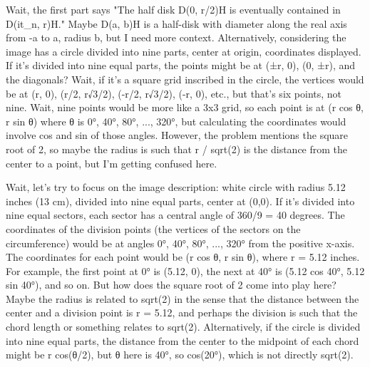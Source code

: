 Wait, the first part says "The half disk D(0, r/2)H is eventually contained in D(it_n, r)H." Maybe D(a, b)H is a half-disk with diameter along the real axis from -a to a, radius b, but I need more context. Alternatively, considering the image has a circle divided into nine parts, center at origin, coordinates displayed. If it's divided into nine equal parts, the points might be at (±r, 0), (0, ±r), and the diagonals? Wait, if it's a square grid inscribed in the circle, the vertices would be at (r, 0), (r/2, r√3/2), (-r/2, r√3/2), (-r, 0), etc., but that's six points, not nine. Wait, nine points would be more like a 3x3 grid, so each point is at (r cos θ, r sin θ) where θ is 0°, 40°, 80°, ..., 320°, but calculating the coordinates would involve cos and sin of those angles. However, the problem mentions the square root of 2, so maybe the radius is such that r / sqrt(2) is the distance from the center to a point, but I'm getting confused here. 

Wait, let's try to focus on the image description: white circle with radius 5.12 inches (13 cm), divided into nine equal parts, center at (0,0). If it's divided into nine equal sectors, each sector has a central angle of 360/9 = 40 degrees. The coordinates of the division points (the vertices of the sectors on the circumference) would be at angles 0°, 40°, 80°, ..., 320° from the positive x-axis. The coordinates for each point would be (r cos θ, r sin θ), where r = 5.12 inches. For example, the first point at 0° is (5.12, 0), the next at 40° is (5.12 cos 40°, 5.12 sin 40°), and so on. But how does the square root of 2 come into play here? Maybe the radius is related to sqrt(2) in the sense that the distance between the center and a division point is r = 5.12, and perhaps the division is such that the chord length or something relates to sqrt(2). Alternatively, if the circle is divided into nine equal parts, the distance from the center to the midpoint of each chord might be r cos(θ/2), but θ here is 40°, so cos(20°), which is not directly sqrt(2). 


